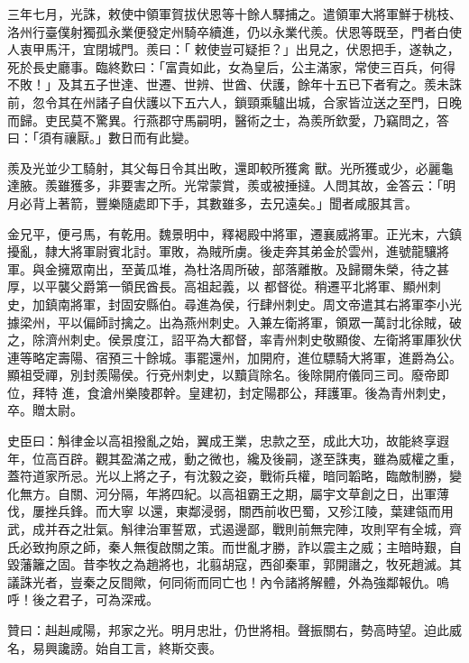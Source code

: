 \begin{pinyinscope}
 三年七月，光誅，敕使中領軍賀拔伏恩等十餘人驛捕之。遣領軍大將軍鮮于桃枝、洛州行臺僕射獨孤永業便發定州騎卒續進，仍以永業代羨。伏恩等既至，門者白使人衷甲馬汗，宜閉城門。羨曰：「
 敕使豈可疑拒？」出見之，伏恩把手，遂執之，死於長史廳事。臨終歎曰：「富貴如此，女為皇后，公主滿家，常使三百兵，何得不敗！」及其五子世達、世遷、世辨、世酋、伏護，餘年十五已下者宥之。羨未誅前，忽令其在州諸子自伏護以下五六人，鎖頸乘驢出城，合家皆泣送之至門，日晚而歸。吏民莫不驚異。行燕郡守馬嗣明，醫術之士，為羨所欽愛，乃竊問之，答曰：「須有禳厭。」數日而有此變。



 羨及光並少工騎射，其父每日令其出畋，還即較所獲禽
 獸。光所獲或少，必麗龜達腋。羨雖獲多，非要害之所。光常蒙賞，羨或被捶撻。人問其故，金答云：「明月必背上著箭，豐樂隨處即下手，其數雖多，去兄遠矣。」聞者咸服其言。



 金兄平，便弓馬，有乾用。魏景明中，釋褐殿中將軍，遷襄威將軍。正光末，六鎮擾亂，隸大將軍尉賓北討。軍敗，為賊所虜。後走奔其弟金於雲州，進號龍驤將軍。與金擁眾南出，至黃瓜堆，為杜洛周所破，部落離散。及歸爾朱榮，待之甚厚，以平襲父爵第一領民酋長。高祖起義，以
 都督從。稍遷平北將軍、顯州刺史，加鎮南將軍，封固安縣伯。尋進為侯，行肆州刺史。周文帝遣其右將軍李小光據梁州，平以偏師討擒之。出為燕州刺史。入兼左衛將軍，領眾一萬討北徐賊，破之，除濟州刺史。侯景度江，詔平為大都督，率青州刺史敬顯俊、左衛將軍厙狄伏連等略定壽陽、宿預三十餘城。事罷還州，加開府，進位驃騎大將軍，進爵為公。顯祖受禪，別封羨陽侯。行兗州刺史，以黷貨除名。後除開府儀同三司。廢帝即位，拜特
 進，食滄州樂陵郡幹。皇建初，封定陽郡公，拜護軍。後為青州刺史，卒。贈太尉。



 史臣曰：斛律金以高祖撥亂之始，翼成王業，忠款之至，成此大功，故能終享遐年，位高百辟。觀其盈滿之戒，動之微也，纔及後嗣，遂至誅夷，雖為威權之重，蓋符道家所忌。光以上將之子，有沈毅之姿，戰術兵權，暗同韜略，臨敵制勝，變化無方。自關、河分隔，年將四紀。以高祖霸王之期，屬宇文草創之日，出軍薄伐，屢挫兵鋒。而大寧
 以還，東鄰浸弱，關西前收巴蜀，又殄江陵，葉建瓴而用武，成并吞之壯氣。斛律治軍誓眾，式遏邊鄙，戰則前無完陣，攻則罕有全城，齊氏必致拘原之師，秦人無復啟關之策。而世亂才勝，詐以震主之威；主暗時艱，自毀藩籬之固。昔李牧之為趙將也，北翦胡寇，西卻秦軍，郭開譖之，牧死趙滅。其議誅光者，豈秦之反間歟，何同術而同亡也！內令諸將解體，外為強鄰報仇。嗚呼！後之君子，可為深戒。



 贊曰：赳赳咸陽，邦家之光。明月忠壯，仍世將相。聲振關右，勢高時望。迫此威名，易興讒謗。始自工言，終斯交喪。



\end{pinyinscope}